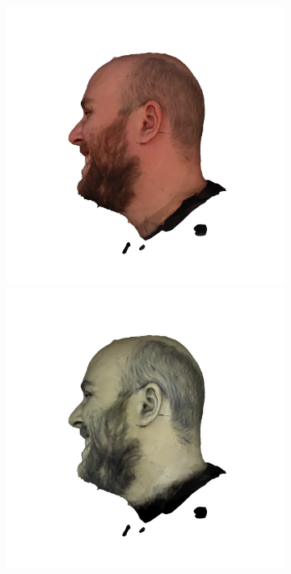 \begin{figure}
\begin{subfigure}{0.18\linewidth}
	\end{subfigure}
    \begin{subfigure}{0.18\linewidth}
        \includegraphics[width=\textwidth]{Figures/failed/stross/3d/snapshot21.png}
        \includegraphics[width=\textwidth]{Figures/failed/stross/3d/snapshot22.png}

\end{subfigure}
\end{figure}
